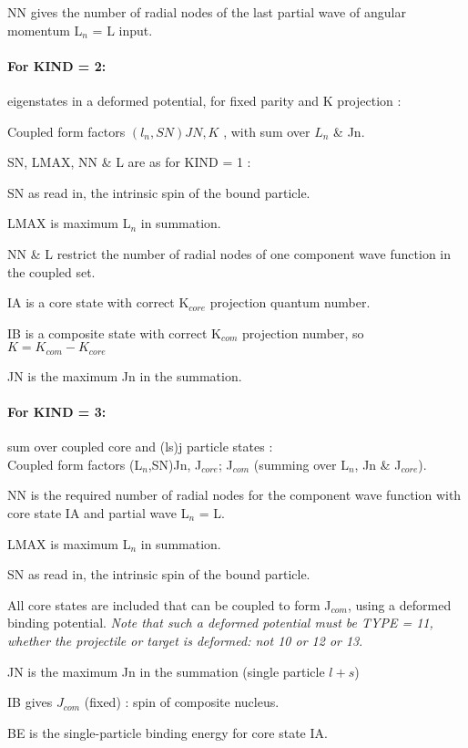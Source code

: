 \documentclass[11pt]{article}
\begin{document}
NN gives the number of radial nodes of the last partial wave of
angular momentum L$_{n}$ = L input.

\paragraph{For KIND = 2:}  eigenstates in a deformed potential, for fixed
parity and K projection :

Coupled form factors  $(l_{n},SN) JN,K$ , with sum over $L_{n}$ \& Jn.

SN, LMAX, NN \& L are as for KIND = 1 :

 SN as read in, the intrinsic spin of the bound particle.
 
 LMAX is maximum L$_{n}$ in summation.
 
 NN \& L restrict the number of radial nodes of one component
wave function in the coupled set.

IA is a core state with correct K$_{core}$ projection quantum number.

IB is a composite state with correct K$_{com}$ projection number, 
    so $K = K_{com} - K_{core}$

JN is the maximum Jn in the summation.

\paragraph{For KIND = 3:}   sum over coupled core and (ls)j particle states :
\\
Coupled form factors (L$_n$,SN)Jn,  J$_{core}$; J$_{com}$
        (summing over L$_n$,   Jn \& J$_{core}$).

NN is the required number of radial nodes for the component
wave function with core state IA and partial wave L$_n$ = L.

LMAX is maximum L$_n$ in summation.

SN as read in, the intrinsic spin of the bound particle.

All core states are included that can be coupled to form J$_{com}$,
using a deformed binding potential.
{\em Note that such a deformed potential must be TYPE = 11,
whether the projectile or target is deformed: not 10 or 12 or 13}.

JN is the maximum Jn in the summation (single particle $l+s$)

IB gives $J_{com}$ (fixed) : spin of composite nucleus.

BE is the single-particle binding energy for core state IA.
\end{document}
